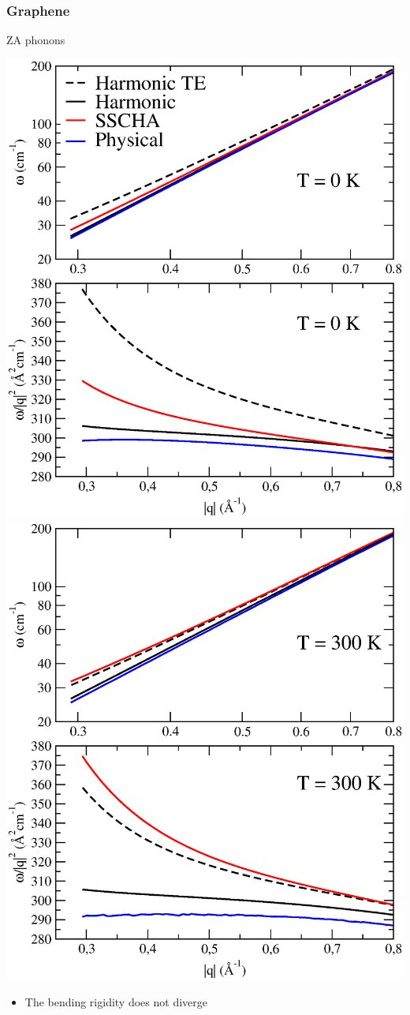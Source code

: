 \documentclass{beamer}
\begin{document}

\begin{frame}

 \frametitle{Graphene}
 ZA phonons
  \begin{center}
  \includegraphics[width=0.49\linewidth]{Pictures/Graphene/T0.eps}
  \includegraphics[width=0.49\linewidth]{Pictures/Graphene/T300.eps}
 \end{center}
\vspace{-0.3cm}
\begin{itemize}
 \item The bending rigidity does not diverge
\end{itemize}
 
\end{frame}

\end{document}
